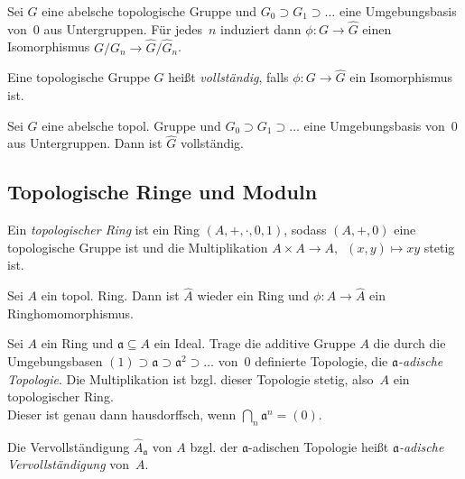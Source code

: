 \documentclass{cheat-sheet}
\newcommand{\aaa}{\mathfrak{a}}
\begin{document}
\begin{kor}
  Sei $G$ eine abelsche topologische Gruppe und $G_0 \supset G_1 \supset \ldots$ eine Umgebungsbasis von~$0$ aus Untergruppen.
  Für jedes~$n$ induziert dann $\phi : G \to \hat{G}$ einen Isomorphismus $G / G_n \to \hat{G} / \hat{G}_n$.
\end{kor}

\begin{defn}
  Eine topologische Gruppe $G$ heißt \emph{vollständig}, falls $\phi : G \to \hat{G}$ ein Isomorphismus ist.
\end{defn}

\begin{prop}
  Sei $G$ eine abelsche topol. Gruppe und $G_0 \supset G_1 \supset \ldots$ eine Umgebungsbasis von~$0$ aus Untergruppen.
  Dann ist $\hat{G}$ vollständig.
\end{prop}

\subsection{Topologische Ringe und Moduln}

\begin{defn}
  Ein \emph{topologischer Ring} ist ein Ring $(A, +, \cdot, 0, 1)$, sodass $(A, +, 0)$ eine topologische Gruppe ist und die Multiplikation $A \times A \to A, \enspace (x, y) \mapsto xy$ stetig ist.
\end{defn}

\begin{bem}
  Sei $A$ ein topol. Ring.
  Dann ist $\hat{A}$ wieder ein Ring und $\phi : A \to \hat{A}$ ein Ringhomomorphismus.
\end{bem}

\begin{konstr}
  Sei $A$ ein Ring und $\aaa \subseteq A$ ein Ideal.
  Trage die additive Gruppe $A$ die durch die Umgebungsbasen $(1) \supset \aaa \supset \aaa^2 \supset \ldots$ von~$0$ definierte Topologie, die \emph{$\aaa$-adische Topologie}.
  Die Multiplikation ist bzgl. dieser Topologie stetig, also~$A$ ein topologischer Ring. \\
  Dieser ist genau dann hausdorffsch, wenn ${\bigcap}_n \aaa^n = (0)$.
\end{konstr}

\begin{defn}
  Die Vervollständigung $\hat{A}_\aaa$ von $A$ bzgl. der $\aaa$-adischen Topologie heißt \emph{$\aaa$-adische Vervollständigung} von~$A$.
\end{defn}
\end{document}
